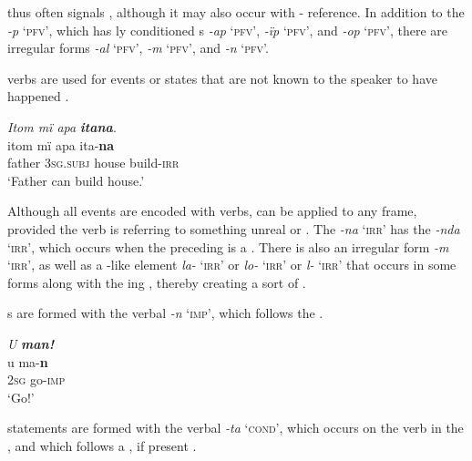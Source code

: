   thus often signals  , although it may also occur with - reference. In addition to the   \textit{{}-p} ‘\textsc{pfv}’, which has ly conditioned s \textit{{}-ap} ‘\textsc{pfv}’, \textit{{}-ïp} ‘\textsc{pfv}’, and \textit{{}-op} ‘\textsc{pfv}’, there are irregular  forms \textit{{}-al} ‘\textsc{pfv}’, \textit{{}-m} ‘\textsc{pfv}’, and \textit{{}-n} ‘\textsc{pfv}’.

 verbs are used for events or states that are not known to the speaker to have happened .

\ea%
    \label{ex:overview:25}
    \textit{Itom mï apa} \textbf{\textit{itana}}.\\
\gll    itom  mï      apa    ita-\textbf{na}\\
    father  3\textsc{sg.subj}  house  build-\textsc{irr}\\
\glt    ‘Father can build house.’
\z

Although all  events are encoded with  verbs,   can be applied to any  frame, provided the verb is referring to something unreal or . The   \textit{{}-na} ‘\textsc{irr}’ has the  \textit{{}-nda} ‘\textsc{irr}’, which occurs when the preceding  is a . There is also an irregular  form \textit{{}-m} ‘\textsc{irr}’, as well as a -like element \textit{la-} ‘\textsc{irr}’ or \textit{lo-} ‘\textsc{irr}’ or \textit{l-} ‘\textsc{irr}’ that occurs in some  forms along with the ing , thereby creating a sort of .

s are formed with the verbal  \textit{{}-n} ‘\textsc{imp’}, which follows the  .

\ea%
    \label{ex:overview:26}
    \textit{U} \textbf{\textit{man!}}\\
\gll    u    ma-\textbf{n}\\
    2\textsc{sg}  go-\textsc{imp}\\
\glt    ‘Go!\textsc{’}
\z

 statements are formed with the verbal  \textit{{}-ta} ‘\textsc{cond’}, which occurs on the verb in the , and which follows a  , if present .

